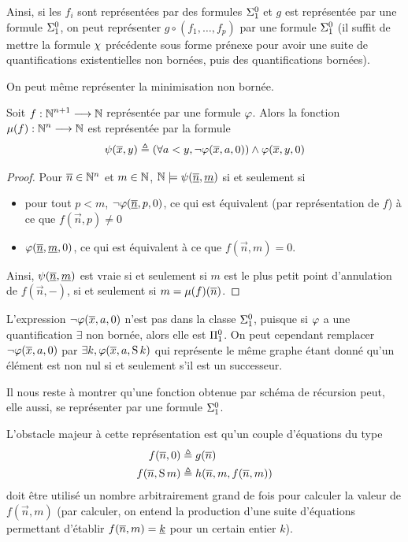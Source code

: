 Ainsi, si les $f_i$ sont représentées par des formules $\Sigma^0_{1}$ et
$g$ est représentée par une formule $\Sigma^0_{1}$, on peut représenter
$g\circ (f_1,\ldots,f_p)$ par une formule $\Sigma^0_{1}$ (il suffit de mettre
la formule $\chi$ précédente sous forme prénexe pour avoir une suite de
quantifications existentielles non bornées, puis des quantifications bornées).

On peut même représenter la minimisation non bornée.

\begin{proposition}
  Soit $f : \displaystyle \mathbb N^{n+1} \longrightarrow \mathbb N$ représentée par une formule $\varphi$.
  Alors la fonction $\mathbin{\mu}(f) : \displaystyle \mathbb N^n \longrightarrow \mathbb N$ est représentée par la
  formule
  \[\psi(\overline{x}, y) \triangleq (\forall a < y, \lnot \varphi(\overline{x},a,0))
  \land \varphi(\overline{x},y,0)\]
\end{proposition}

\begin{proof}
  Pour $\overline{n} \in \mathbb N^n$ et $m \in \mathbb N$,
  $\mathbb N \models \psi(\underline{\overline{n}},\underline{m})$ si et seulement si
  \begin{itemize}
  \item pour tout $p < m$, $\lnot \varphi(\underline{\overline{n}},p,0)$, ce qui est
    équivalent (par représentation de $f$) à ce que $f(\vec n,p) \neq 0$
  \item $\varphi(\underline{\overline{n}},\underline{m},0)$, ce qui est équivalent à ce que
    $f(\vec n,m) = 0$.
  \end{itemize}
  Ainsi, $\psi(\underline{\overline{n}}, \underline{m})$ est vraie si et
  seulement si $m$ est le plus petit point d'annulation de $f(\vec n,-)$, si
  et seulement si $m = \mathbin{\mu}(f)(\overline{n})$.
\end{proof}

\begin{remark}
  L'expression $\lnot\varphi(\overline{x}, a, 0)$ n'est pas  dans
  la classe $\Sigma^0_{1}$, puisque si $\varphi$ a une quantification $\exists$
  non bornée, alors elle est $\Pi^0_{1}$. On peut cependant remplacer
  $\lnot\varphi(\overline{x},a,0)$ par $\exists k, \varphi(\overline{x}, a, \operatorname{S} k)$ qui
  représente le même graphe étant donné qu'un élément est non nul si et
  seulement s'il est un successeur.
\end{remark}

Il nous reste à montrer qu'une fonction obtenue par schéma de récursion peut,
elle aussi, se représenter par une formule $\Sigma^0_{1}$.

L'obstacle majeur à cette représentation est qu'un couple d'équations du type
\begin{align*}
  f(\overline{n},0) &\triangleq g(\overline{n}) \\
  f(\overline{n}, \operatorname{S} m) &\triangleq h(\overline{n},m,f(\overline{n},m))
\end{align*}
doit être utilisé un nombre arbitrairement grand de fois pour calculer la valeur
de $f(\vec n,m)$ (par \og calculer\fg{}, on entend la production d'une suite
d'équations permettant d'établir $f(\overline{n},m) = \underline{k}$ pour un certain
entier $k$).

